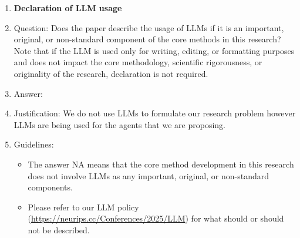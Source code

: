 \documentclass{article}
\begin{document}
\begin{enumerate}
\item {\bf Declaration of LLM usage}
    \item[] Question: Does the paper describe the usage of LLMs if it is an important, original, or non-standard component of the core methods in this research? Note that if the LLM is used only for writing, editing, or formatting purposes and does not impact the core methodology, scientific rigorousness, or originality of the research, declaration is not required.
    \item[] Answer: \answerYes{} %
    \item[] Justification: We do not use LLMs to formulate our research problem however LLMs are being used for the agents that we are proposing. 
    \item[] Guidelines:
    \begin{itemize}
        \item The answer NA means that the core method development in this research does not involve LLMs as any important, original, or non-standard components.
        \item Please refer to our LLM policy (\url{https://neurips.cc/Conferences/2025/LLM}) for what should or should not be described.
    \end{itemize}

\end{enumerate}

\newpage


\end{document}
